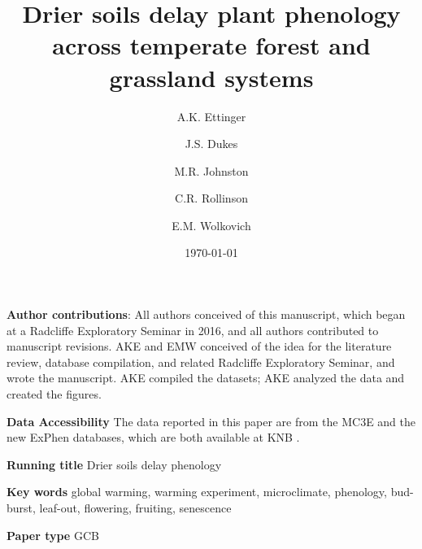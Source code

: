 \documentclass{article}
\begin{document}



\title{Drier soils delay plant phenology across temperate forest and grassland systems} 
\author[1,2,a]{A.K. Ettinger}
\author[3,b]{J.S. Dukes}
\author[4,c]{M.R. Johnston}
\author[5,d]{C.R. Rollinson}
\author[1,4,6,e]{E.M. Wolkovich}









\date{\today}
\maketitle 
\textbf{Author contributions}: All authors conceived of this manuscript, which began at a Radcliffe Exploratory Seminar in 2016, and all authors contributed to manuscript revisions. AKE and EMW conceived of the idea for the literature review, database compilation, and related Radcliffe Exploratory Seminar, and wrote the manuscript. AKE compiled the datasets; AKE analyzed the data and created the figures.

\textbf{Data Accessibility} 
The data reported in this paper are from the MC3E and the new ExPhen databases, which are both available at KNB \citep{ettinger2018,ettinger2022}. %

\textbf{Running title} Drier soils delay phenology

\textbf{Key words} global warming, warming experiment, microclimate, phenology, bud-burst, leaf-out, flowering, fruiting, senescence 


\textbf{Paper type} GCB %
\end{document}
